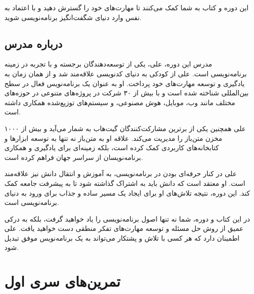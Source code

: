 \documentclass[a4paper,12pt]{article}
\begin{document}
	این دوره و کتاب به شما کمک می‌کنند تا مهارت‌های خود را گسترش دهید و با اعتماد به نفس وارد دنیای شگفت‌انگیز برنامه‌نویسی شوید.
	
	
	\subsection*{درباره مدرس}
	
	مدرس این دوره، علی، یکی از توسعه‌دهندگان برجسته و با تجربه در زمینه برنامه‌نویسی است. علی از کودکی به دنیای کدنویسی علاقه‌مند شد و از همان زمان به یادگیری و توسعه مهارت‌های خود پرداخت. او به عنوان یک برنامه‌نویس فعال در سطح بین‌المللی شناخته شده است و با بیش از ۳۰ شرکت در پروژه‌های متنوعی در حوزه‌های مختلف مانند وب، موبایل، هوش مصنوعی، و سیستم‌های توزیع‌شده همکاری داشته است.
	
	علی همچنین یکی از برترین مشارکت‌کنندگان گیت‌هاب به شمار می‌آید و بیش از ۱۰۰۰ مخزن متن‌باز را مدیریت می‌کند. علاقه او به متن‌باز نه تنها به توسعه ابزارها و کتابخانه‌های کاربردی کمک کرده است، بلکه زمینه‌ای برای یادگیری و همکاری برنامه‌نویسان از سراسر جهان فراهم کرده است.
	
	علی در کنار حرفه‌ای بودن در برنامه‌نویسی، به آموزش و انتقال دانش نیز علاقه‌مند است. او معتقد است که دانش باید به اشتراک گذاشته شود تا به پیشرفت جامعه کمک کند. این دوره، نتیجه تلاش‌های او برای ایجاد یک مسیر ساده و جذاب برای ورود به دنیای برنامه‌نویسی است. 
	
	در این کتاب و دوره، شما نه تنها اصول برنامه‌نویسی را یاد خواهید گرفت، بلکه به درکی عمیق از روش حل مسئله و توسعه مهارت‌های تفکر منطقی دست خواهید یافت. علی اطمینان دارد که هر کسی با تلاش و پشتکار می‌تواند به یک برنامه‌نویس موفق تبدیل شود.
	
	
	\newpage
	\section*{تمرین‌های سری اول}
	
\end{document}
